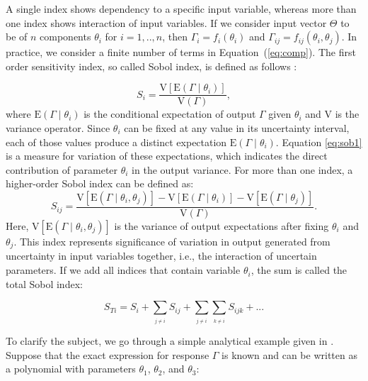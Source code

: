 A single index shows dependency to a specific input variable, whereas more than
one index shows interaction of input variables. If we consider input vector
$\Theta$ to be of $n$ components $\theta_{i}$ for $i=1,..,n$, then
$\Gamma_{i}=f_{i}(\theta_{i})$ and $\Gamma_{ij}=f_{ij}(\theta_{i},\theta_{j})$.
In practice, we consider a finite number of terms in Equation~(\ref{eq:comp}).
 The first order sensitivity index, so called Sobol index, is defined as follows
\cite{saltelli2007global}:

\begin{equation}
S_{i}=\frac{\mbox{V}[\mbox{E}(\Gamma\mid\theta_{i})]}{\mbox{V}(\Gamma)},
\label{eq:sob1}\end{equation} where $\mbox{E}(\Gamma\mid\theta_{i})$ is the
conditional
expectation of output $\Gamma$ given $\theta_{i}$ and $\mbox{V}$ is the variance
operator. Since $\theta_{i}$ can be fixed at any value in its uncertainty
interval, each of those values produce a distinct expectation
$\mbox{E}(\Gamma\mid\theta_{i})$. Equation \ref{eq:sob1} is a measure for
variation of these expectations, which indicates the direct contribution of
parameter $\theta_i$ in the output variance. For more than one index, a
higher-order Sobol index can be defined as:\begin{equation}
S_{ij}=\frac{\mbox{V}[\mbox{E}(\Gamma\mid\theta_{i},\theta_{j})]-\mbox{V}[\mbox{
E}(\Gamma\mid\theta_{i})]-\mbox{V}[\mbox{E}(\Gamma\mid\theta_{j})]}{\mbox{V}
(\Gamma)}.\label{eq:sob2}\end{equation} Here,
$\mbox{V}[\mbox{E}(\Gamma\mid\theta_{i},\theta_{j})]$ is the variance of output
expectations after fixing $\theta_{i}$ and $\theta_{j}$. This index represents
significance of variation in output generated from uncertainty in input 
variables together, i.e., the interaction of uncertain parameters. If we add all
indices that contain variable $\theta_{i}$, the sum is called the total Sobol
index:

\begin{equation}
S_{Ti}=S_{i}+\underset{_{j\neq i}}{\sum}S_{ij}+\underset{_{j\neq
i}}{\sum}\underset{_{k\neq i}}{\sum}S_{ijk}+...\label{eq:totSob}\end{equation}

To clarify the subject, we go through a simple analytical example given in
\cite{arwade2010variance}. Suppose that the exact expression for response
$\Gamma$ is known and can be written as a polynomial with parameters
$\theta_1$, $\theta_2$, and $\theta_3$:
 
